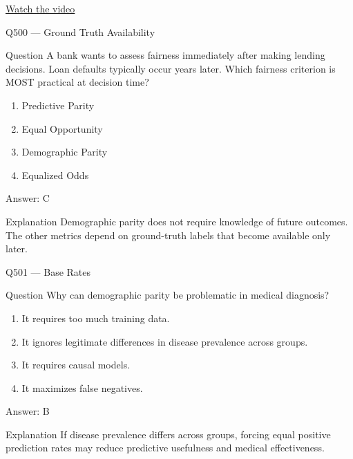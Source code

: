 \documentclass[aspectratio=169,8pt]{beamer}
\begin{document}
\begin{frame}
	\href{https://www.youtube.com/watch?v=D035nSq7LaU}{Watch the video}
\end{frame}





\begin{frame}{Q500 --- Ground Truth Availability}
	\begin{block}{Question}
		A bank wants to assess fairness immediately after making lending decisions. Loan defaults typically occur years later. Which fairness criterion is MOST practical at decision time?
		\begin{enumerate}
			\item Predictive Parity
			\item Equal Opportunity
			\item Demographic Parity
			\item Equalized Odds
		\end{enumerate}
	\end{block}
	\begin{exampleblock}{Answer: C}\end{exampleblock}
	\begin{block}{Explanation}
		Demographic parity does not require knowledge of future outcomes. The other metrics depend on ground-truth labels that become available only later.
	\end{block}
\end{frame}

\begin{frame}{Q501 --- Base Rates}
	\begin{block}{Question}
		Why can demographic parity be problematic in medical diagnosis?
		\begin{enumerate}
			\item It requires too much training data.
			\item It ignores legitimate differences in disease prevalence across groups.
			\item It requires causal models.
			\item It maximizes false negatives.
		\end{enumerate}
	\end{block}
	\begin{exampleblock}{Answer: B}\end{exampleblock}
	\begin{block}{Explanation}
		If disease prevalence differs across groups, forcing equal positive prediction rates may reduce predictive usefulness and medical effectiveness.
	\end{block}
\end{frame}
\end{document}
